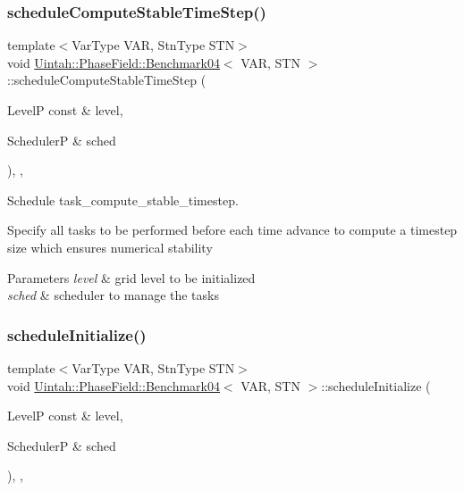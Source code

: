 \subsubsection{\texorpdfstring{schedule\+Compute\+Stable\+Time\+Step()}{scheduleComputeStableTimeStep()}}
{\footnotesize\ttfamily template$<$Var\+Type V\+AR, Stn\+Type S\+TN$>$ \\
void \hyperlink{classUintah_1_1PhaseField_1_1Benchmark04}{Uintah\+::\+Phase\+Field\+::\+Benchmark04}$<$ V\+AR, S\+TN $>$\+::schedule\+Compute\+Stable\+Time\+Step (\begin{DoxyParamCaption}\item[{LevelP const \&}]{level,  }\item[{SchedulerP \&}]{sched }\end{DoxyParamCaption})\hspace{0.3cm}{\ttfamily [override]}, {\ttfamily [protected]}, {\ttfamily [virtual]}}



Schedule task\+\_\+compute\+\_\+stable\+\_\+timestep. 

Specify all tasks to be performed before each time advance to compute a timestep size which ensures numerical stability


\begin{DoxyParams}{Parameters}
{\em level} & grid level to be initialized \\
\hline
{\em sched} & scheduler to manage the tasks \\
\hline
\end{DoxyParams}
\mbox{\label{classUintah_1_1PhaseField_1_1Benchmark04_a23ba99dde87f5fa7fd25956bc49217f7}} 
\subsubsection{\texorpdfstring{schedule\+Initialize()}{scheduleInitialize()}}
{\footnotesize\ttfamily template$<$Var\+Type V\+AR, Stn\+Type S\+TN$>$ \\
void \hyperlink{classUintah_1_1PhaseField_1_1Benchmark04}{Uintah\+::\+Phase\+Field\+::\+Benchmark04}$<$ V\+AR, S\+TN $>$\+::schedule\+Initialize (\begin{DoxyParamCaption}\item[{LevelP const \&}]{level,  }\item[{SchedulerP \&}]{sched }\end{DoxyParamCaption})\hspace{0.3cm}{\ttfamily [override]}, {\ttfamily [protected]}, {\ttfamily [virtual]}}



